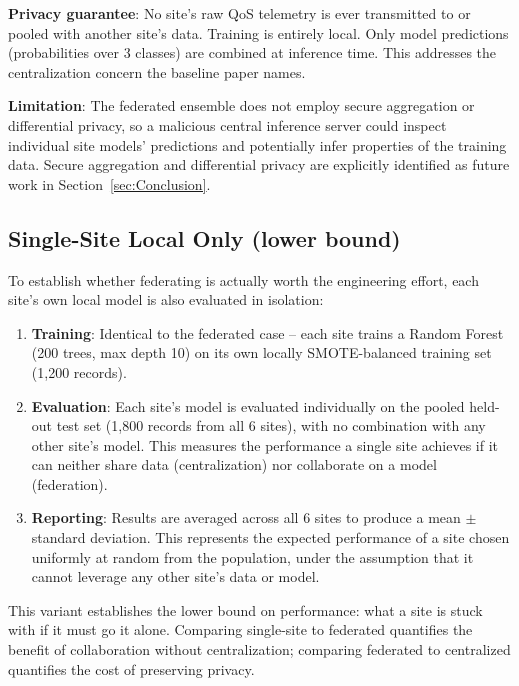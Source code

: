 \textbf{Privacy guarantee}: No site's raw QoS telemetry is ever transmitted to or pooled with another site's data. Training is entirely local. Only model predictions (probabilities over 3 classes) are combined at inference time. This addresses the centralization concern the baseline paper names.

\textbf{Limitation}: The federated ensemble does not employ secure aggregation or differential privacy, so a malicious central inference server could inspect individual site models' predictions and potentially infer properties of the training data. Secure aggregation and differential privacy are explicitly identified as future work in Section~\ref{sec:Conclusion}.

\subsection{Single-Site Local Only (lower bound)}
\label{subsec:single-site}

To establish whether federating is actually worth the engineering effort, each site's own local model is also evaluated in isolation:

\begin{enumerate}
  \item \textbf{Training}: Identical to the federated case -- each site trains a Random Forest (200 trees, max depth 10) on its own locally SMOTE-balanced training set (1,200 records).
  
  \item \textbf{Evaluation}: Each site's model is evaluated individually on the pooled held-out test set (1,800 records from all 6 sites), with no combination with any other site's model. This measures the performance a single site achieves if it can neither share data (centralization) nor collaborate on a model (federation).
  
  \item \textbf{Reporting}: Results are averaged across all 6 sites to produce a mean $\pm$ standard deviation. This represents the expected performance of a site chosen uniformly at random from the population, under the assumption that it cannot leverage any other site's data or model.
\end{enumerate}

This variant establishes the lower bound on performance: what a site is stuck with if it must go it alone. Comparing single-site to federated quantifies the benefit of collaboration without centralization; comparing federated to centralized quantifies the cost of preserving privacy.
